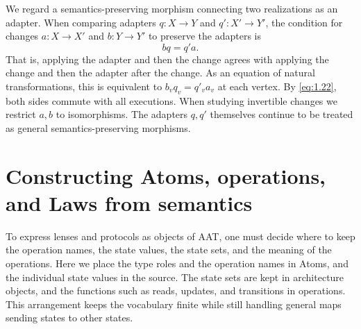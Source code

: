 We regard a semantics-preserving morphism connecting two realizations as an
adapter.
When comparing adapters $q:X\to Y$ and $q':X'\to Y'$, the condition for
changes $a:X\to X'$ and $b:Y\to Y'$ to preserve the adapters is
\begin{equation*}
bq=q'a.
\tag{1.23}\label{eq:1.23}
\end{equation*}
That is, applying the adapter and then the change agrees with applying the
change and then the adapter after the change.
As an equation of natural transformations, this is equivalent to
$b_vq_v=q'_va_v$ at each vertex.
By \eqref{eq:1.22}, both sides commute with all executions.
When studying invertible changes we restrict $a,b$ to isomorphisms.
The adapters $q,q'$ themselves continue to be treated as general
semantics-preserving morphisms.

\section{Constructing Atoms, operations, and Laws from semantics}\label{sec:1.10}

To express lenses and protocols as objects of AAT, one must decide where to
keep the operation names, the state values, the state sets, and the meaning of
the operations.
Here we place the type roles and the operation names in Atoms, and the
individual state values in the source.
The state sets are kept in architecture objects, and the functions such as
reads, updates, and transitions in operations.
This arrangement keeps the vocabulary finite while still handling general maps
sending states to other states.

